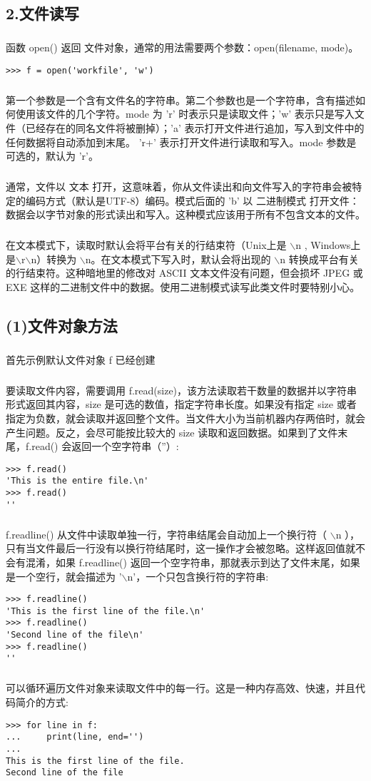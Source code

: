 \documentclass{article}
\begin{document}
\begin{CJK}{UTF8}{gbsn}
\section*{2.文件读写}
\subparagraph*{}
函数 open() 返回 文件对象，通常的用法需要两个参数：open(filename, mode)。
\begin{verbatim}
>>> f = open('workfile', 'w')
\end{verbatim}
\subparagraph*{}
第一个参数是一个含有文件名的字符串。第二个参数也是一个字符串，含有描述如何使用该文件的几个字符。mode 为 'r' 时表示只是读取文件；'w' 表示只是写入文件（已经存在的同名文件将被删掉）；'a' 表示打开文件进行追加，写入到文件中的任何数据将自动添加到末尾。 'r+' 表示打开文件进行读取和写入。mode 参数是可选的，默认为 'r'。
\subparagraph*{}
通常，文件以 文本 打开，这意味着，你从文件读出和向文件写入的字符串会被特定的编码方式（默认是UTF-8）编码。模式后面的 'b' 以 二进制模式 打开文件：数据会以字节对象的形式读出和写入。这种模式应该用于所有不包含文本的文件。
\subparagraph*{}
在文本模式下，读取时默认会将平台有关的行结束符（Unix上是 $\backslash$n , Windows上是$\backslash$r$\backslash$n）转换为 $\backslash$n。在文本模式下写入时，默认会将出现的 $\backslash$n 转换成平台有关的行结束符。这种暗地里的修改对 ASCII 文本文件没有问题，但会损坏 JPEG 或 EXE 这样的二进制文件中的数据。使用二进制模式读写此类文件时要特别小心。
\subsection*{(1)文件对象方法}
\subparagraph*{}
首先示例默认文件对象 f 已经创建
\subparagraph*{}
要读取文件内容，需要调用 f.read(size)，该方法读取若干数量的数据并以字符串形式返回其内容，size 是可选的数值，指定字符串长度。如果没有指定 size 或者指定为负数，就会读取并返回整个文件。当文件大小为当前机器内存两倍时，就会产生问题。反之，会尽可能按比较大的 size 读取和返回数据。如果到了文件末尾，f.read() 会返回一个空字符串（''）:
\begin{verbatim}
>>> f.read()
'This is the entire file.\n'
>>> f.read()
''
\end{verbatim}
\subparagraph*{}
f.readline() 从文件中读取单独一行，字符串结尾会自动加上一个换行符（ $\backslash$n ），只有当文件最后一行没有以换行符结尾时，这一操作才会被忽略。这样返回值就不会有混淆，如果 f.readline() 返回一个空字符串，那就表示到达了文件末尾，如果是一个空行，就会描述为 '$\backslash$n'，一个只包含换行符的字符串:
\begin{verbatim}
>>> f.readline()
'This is the first line of the file.\n'
>>> f.readline()
'Second line of the file\n'
>>> f.readline()
''
\end{verbatim}
\subparagraph*{}
可以循环遍历文件对象来读取文件中的每一行。这是一种内存高效、快速，并且代码简介的方式:
\begin{verbatim}
>>> for line in f:
...     print(line, end='')
...
This is the first line of the file.
Second line of the file


\end{verbatim}
\end{CJK}
\end{document}

